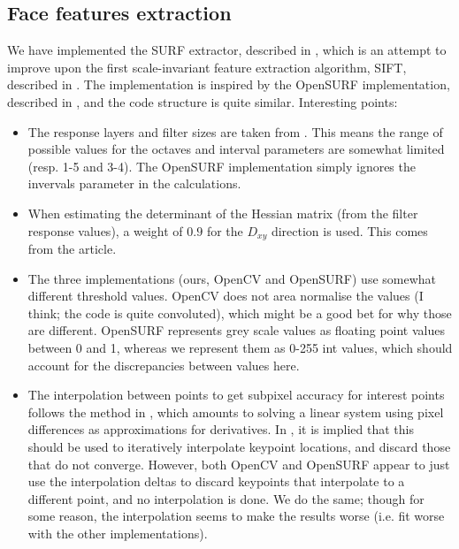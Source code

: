 \subsection{Face features extraction}
\label{sec:features}
We have implemented the SURF extractor, described in \cite{SURF},
which is an attempt to improve upon the first scale-invariant feature
extraction algorithm, SIFT, described in \cite{SIFT}. The
implementation is inspired by the OpenSURF implementation, described
in \cite{OpenSURF}, and the code structure is quite similar.
Interesting points:

\begin{itemize}
\item The response layers and filter sizes are taken from \cite{SURF}.
  This means the range of possible values for the octaves and interval
  parameters are somewhat limited (resp. 1-5 and 3-4). The OpenSURF
  implementation simply ignores the invervals parameter in the
  calculations.
\item When estimating the determinant of the Hessian matrix (from the
  filter response values), a weight of $0.9$ for the $D_{xy}$
  direction is used. This comes from the article.
\item The three implementations (ours, OpenCV and OpenSURF) use
  somewhat different threshold values. OpenCV does not area normalise
  the values (I think; the code is quite convoluted), which might be a
  good bet for why those are different. OpenSURF represents grey scale
  values as floating point values between 0 and 1, whereas we
  represent them as 0-255 int values, which should account for the
  discrepancies between values here.
\item The interpolation between points to get subpixel accuracy for
  interest points follows the method in \cite{inv-features}, which
  amounts to solving a linear system using pixel differences as
  approximations for derivatives. In \cite{SURF}, it is implied that
  this should be used to iteratively interpolate keypoint locations,
  and discard those that do not converge. However, both OpenCV and
  OpenSURF appear to just use the interpolation deltas to discard
  keypoints that interpolate to a different point, and no
  interpolation is done. We do the same; though for some reason, the
  interpolation seems to make the results worse (i.e. fit worse with
  the other implementations).
\end{itemize}
